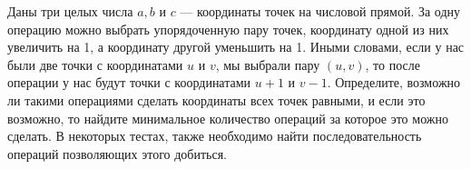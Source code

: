 Даны три целых числа $a, b $ и $c$ --- координаты точек на числовой прямой. За одну операцию можно выбрать упорядоченную пару точек, координату одной из них увеличить на 1, а координату другой уменьшить на 1. Иными словами, если у нас были две точки с координатами $u$ и $v$, мы выбрали пару $(u, v)$, то после операции у нас будут точки с координатами $u+1$ и $v-1$. Определите, возможно ли такими операциями сделать координаты всех точек равными, и если это возможно, то найдите минимальное количество операций за которое это можно сделать. В некоторых тестах, также необходимо найти последовательность операций позволяющих этого добиться.